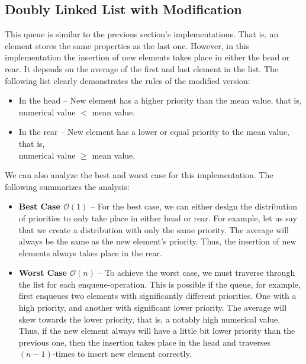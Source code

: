 \documentclass[a4paper,11pt]{kth-mag}
\newcommand*{\skippara}{\par\vspace{\baselineskip} \noindent}
\begin{document}
\subsection{Doubly Linked List with Modification}
This queue is similar to the previous section's implementations.
That is, an element stores the same properties as the last one.
However, in this implementation the insertion of new elements takes place in either the head or rear.
It depends on the average of the first and last element in the list.
The following list clearly demonstrates the rules of the modified version:
\begin{itemize}
    \item In the head -- New element has a higher priority than the mean value, that is, \\numerical value $<$ mean value.
    \item In the rear -- New element has a lower or equal priority to the mean value, that is,\\numerical value $\ge$ mean value.
\end{itemize}

\skippara We can also analyze the best and worst case for this implementation.
The following summarizes the analysis:
\begin{itemize}
    \item \textbf{Best Case $\mathcal{O}(1)$} -- For the best case, we can either design the distribution of priorities to only take place in either head or rear.
        For example, let us say that we create a distribution with only the same priority.
        The average will always be the same as the new element's priority.
        Thus, the insertion of new elements always takes place in the rear.
    \item \textbf{Worst Case $\mathcal{O}(n)$} -- To achieve the worst case, we must traverse through the list for each enqueue-operation.
        This is possible if the queue, for example, first enqueues two elements with significantly different priorities.
        One with a high priority, and another with significant lower priority.
        The average will skew towards the lower priority, that is, a notably high numerical value.
        Thus, if the new element always will have a little bit lower priority than the previous one, then the insertion takes place in the head and traverses $(n-1)$-times to insert new element correctly.
\end{itemize}
\end{document}
